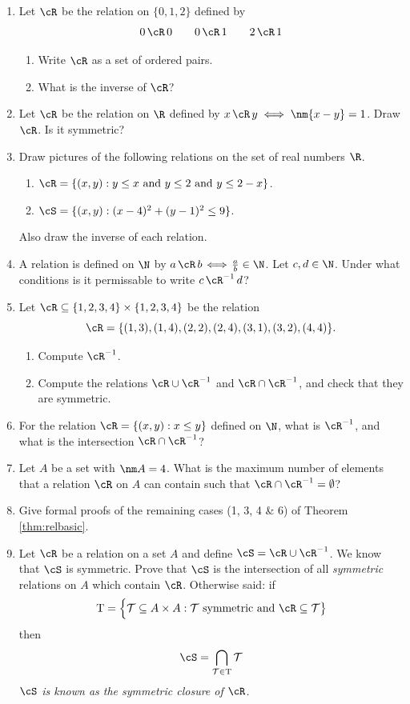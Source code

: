 \begin{enumerate}\renewcommand{\labelenumi}{\thesubsection.\theenumi}
  \item Let $\cR$ be the relation on $\{0,1,2\}$ defined by
  \[0\,\cR\,0\qquad 0\,\cR\,1\qquad 2\,\cR\,1\]
  \begin{enumerate}
    \item Write $\cR$ as a set of ordered pairs.
    \item What is the inverse of $\cR$?
	\end{enumerate}
	
	\item Let $\cR$ be the relation on $\R$ defined by $x\,\cR\,y\iff\nm{x-y}=1$. Draw $\cR$. Is it symmetric?
  
	\item Draw pictures of the following relations on the set of real numbers $\R$.
		\begin{enumerate}
			\item $\cR=\{(x,y):y\le x\text{ and }y\le 2\text{ and }y\le 2-x\}$.
			\item $\cS=\{(x,y):(x-4)^2+(y-1)^2\le 9\}$.
		\end{enumerate}
	Also draw the inverse of each relation.
	
	\item A relation is defined on $\N$ by $a\,\cR\,b\!\iff\! \frac ab\in\N$. Let $c,d\in\N$. Under what conditions is it permissable to write $c\,\cR^{-1}\,d$?
	
	\item Let $\cR\subseteq\{1,2,3,4\}\times\{1,2,3,4\}$ be the relation
	\[\cR=\{(1,3),(1,4),(2,2),(2,4),(3,1),(3,2),(4,4)\}.\]
	\begin{enumerate}
	  \item Compute $\cR^{-1}$.
	  \item Compute the relations $\cR\cup \cR^{-1}$ and $\cR\cap \cR^{-1}$, and check that they are symmetric.
	\end{enumerate}
  
  \item For the relation $\cR=\{(x,y):x\le y\}$ defined on $\N$, what is $\cR^{-1}$, and what is the intersection $\cR\cap\cR^{-1}$?

  \item Let $A$ be a set with $\nm A=4$. What is the maximum number of elements that a relation $\cR$ on $A$ can contain such that $\cR\cap \cR^{-1}=\emptyset$?
  
  \item Give formal proofs of the remaining cases (1, 3, 4 \& 6) of Theorem \ref{thm:relbasic}.
  
  \item Let $\cR$ be a relation on a set $A$ and define $\cS=\cR\cup\cR^{-1}$. We know that $\cS$ is symmetric. Prove that $\cS$ is the intersection of all \emph{symmetric} relations on $A$ which contain $\cR$. Otherwise said: if
  \[\mathrm T=\Bigl\{\mathcal T\subseteq A\times A:\mathcal T\text{ symmetric and }\cR\subseteq\mathcal T\bigr\}\]
  then
  \[\cS=\bigcap\limits_{\mathcal T\in \mathrm T} \mathcal T\]
  \emph{$\cS$ is known as the \emph{symmetric closure} of $\cR$.}
\end{enumerate}
\newpage


